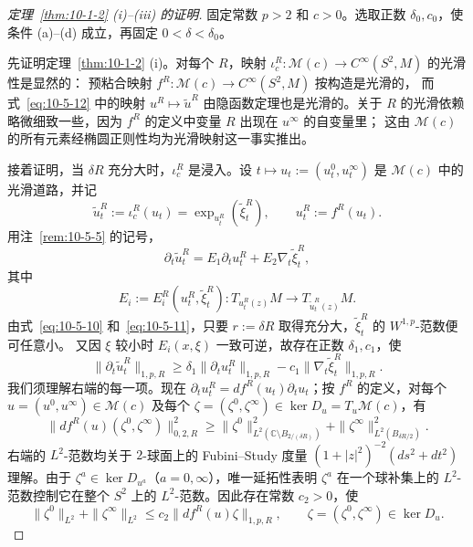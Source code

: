 \begin{proof}[定理~\ref{thm:10-1-2} (i)--(iii) 的证明]
固定常数 $p>2$ 和 $c>0$。选取正数 $\delta_0,c_0$，使条件 (a)--(d)
成立，再固定 $0<\delta<\delta_0$。

先证明定理~\ref{thm:10-1-2} (i)。对每个 $R$，映射
$\iota_c^R:\mathcal M(c)\to C^\infty(S^2,M)$ 的光滑性是显然的：
预粘合映射 $f^R:\mathcal M(c)\to C^\infty(S^2,M)$ 按构造是光滑的，
而式~\eqref{eq:10-5-12} 中的映射
$u^R\mapsto\widetilde u^R$ 由隐函数定理也是光滑的。关于 $R$ 的光滑依赖
略微细致一些，因为 $f^R$ 的定义中变量 $R$ 出现在 $u^\infty$ 的自变量里；
这由 $\mathcal M(c)$ 的所有元素经椭圆正则性均为光滑映射这一事实推出。

接着证明，当 $\delta R$ 充分大时，$\iota_c^R$ 是浸入。设
$t\mapsto u_t:=(u_t^0,u_t^\infty)$ 是 $\mathcal M(c)$ 中的光滑道路，并记
\[
  \widetilde u_t^R:=\iota_c^R(u_t)
  =\exp_{u_t^R}(\widetilde\xi_t^R),
  \qquad u_t^R:=f^R(u_t).
\]
用注~\ref{rem:10-5-5} 的记号，
\[
  \partial_t\widetilde u_t^R
  =E_1\partial_tu_t^R+E_2\nabla_t\widetilde\xi_t^R,
\]
其中
\[
  E_i:=E_i^R(u_t^R,\widetilde\xi_t^R):
  T_{u_t^R(z)}M\longrightarrow T_{\widetilde u_t^R(z)}M.
\]
由式~\eqref{eq:10-5-10} 和~\eqref{eq:10-5-11}，只要
$r:=\delta R$ 取得充分大，$\widetilde\xi_t^R$ 的 $W^{1,p}$-范数便可任意小。
又因 $\xi$ 较小时 $E_i(x,\xi)$ 一致可逆，故存在正数 $\delta_1,c_1$，使
\begin{equation}\label{eq:10-5-14}
  \|\partial_t\widetilde u_t^R\|_{1,p,R}
  \ge\delta_1\|\partial_tu_t^R\|_{1,p,R}
    -c_1\|\nabla_t\widetilde\xi_t^R\|_{1,p,R}.
\end{equation}
我们须理解右端的每一项。现在
$\partial_tu_t^R=df^R(u_t)\partial_tu_t$；按 $f^R$ 的定义，对每个
$u=(u^0,u^\infty)\in\mathcal M(c)$ 及每个
$\zeta=(\zeta^0,\zeta^\infty)\in\ker D_u=T_u\mathcal M(c)$，有
\[
  \|df^R(u)(\zeta^0,\zeta^\infty)\|_{0,2,R}^2
  \ge
  \|\zeta^0\|_{L^2(\mathbb C\setminus B_{2/(\delta R)})}^2
  +\|\zeta^\infty\|_{L^2(B_{\delta R/2})}^2.
\]
右端的 $L^2$-范数均关于 $2$-球面上的 Fubini--Study 度量
$(1+|z|^2)^{-2}(ds^2+dt^2)$ 理解。由于
$\zeta^a\in\ker D_{u^a}$（$a=0,\infty$），唯一延拓性表明
$\zeta^a$ 在一个球补集上的 $L^2$-范数控制它在整个 $S^2$ 上的
$L^2$-范数。因此存在常数 $c_2>0$，使
\begin{equation}\label{eq:10-5-15}
  \|\zeta^0\|_{L^2}+\|\zeta^\infty\|_{L^2}
  \le c_2\|df^R(u)\zeta\|_{1,p,R},
  \qquad \zeta=(\zeta^0,\zeta^\infty)\in\ker D_u.
\end{equation}

\end{proof}
